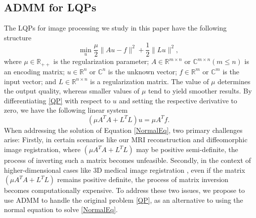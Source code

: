 \documentclass[letterpaper]{article} %
\begin{document}
\subsection{ADMM for LQPs}
The LQPs for image processing we study in this paper have the following structure
\begin{equation}\label{QP}
	\min\limits_{u}\frac{\mu}{2}\|Au-f\|^2+\frac{1}{2}\|L u\|^2,
\end{equation}
where $\mu\in\mathbb{R}_{++}$ is the regularization parameter; $A\in \mathbb{R}^{m\times n}$ or $\mathbb{C}^{m\times n} \left(m \leq n\right)$ is an encoding matrix; $u\in \mathbb{R}^{n}$ or  $\mathbb{C}^{n}$ is the unknown vector; $f\in \mathbb{R}^{m}$ or $\mathbb{C}^{m} $ is the input vector; and $L\in \mathbb{R}^{n\times n}$ is a regularization matrix. The value of $\mu$ determines the output quality, whereas smaller values of $\mu$ tend to yield smoother results. By differentiating \eqref{QP} with respect to $u$ and setting the respective derivative to zero, we have the following linear system
\begin{equation}\label{NormalEq}
	\left(\mu A^TA + L^TL\right) u = \mu A^T f.
\end{equation}
When addressing the solution of Equation \eqref{NormalEq}, two primary challenges arise: Firstly, in certain scenarios like our MRI reconstruction and diffeomorphic image registration, where $\left(\mu A^TA + L^TL\right)$ may be positive semi-definite, the process of inverting such a matrix becomes unfeasible. Secondly, in the context of higher-dimensional cases like 3D medical image registration \cite{thorley2021nesterov}, even if the matrix $\left(\mu A^TA + L^TL\right)$ remains positive definite, the process of matrix inversion becomes computationally expensive. To address these two issues, we propose to use ADMM to handle the original problem \eqref{QP}, as an alternative to using the normal equation to solve \eqref{NormalEq}.
\end{document}

